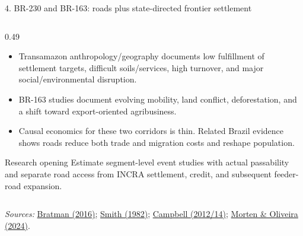 \documentclass[aspectratio=169,10pt]{beamer}
\newcommand{\ShortSource}[1]{%
  \vfill\par\tiny\color{Muted}\textit{Sources:} #1}
\begin{document}
\begin{frame}{4. BR-230 and BR-163: roads plus state-directed frontier settlement}
\begin{columns}[T,onlytextwidth]
\begin{column}{0.49\textwidth}
  \begin{itemize}\setlength\itemsep{0.28em}
    \item Transamazon anthropology/geography documents low fulfillment of settlement targets, difficult soils/services, high turnover, and major social/environmental disruption.
    \item BR-163 studies document evolving mobility, land conflict, deforestation, and a shift toward export-oriented agribusiness.
    \item Causal economics for these two corridors is thin. Related Brazil evidence shows roads reduce both trade and migration costs and reshape population.
  \end{itemize}
  \begin{block}{Research opening}
    Estimate segment-level event studies with actual passability and separate road access from INCRA settlement, credit, and subsequent feeder-road expansion.
  \end{block}
\end{column}
\end{columns}
\ShortSource{\href{https://doi.org/10.1590/1809-4422ASOC256V1922016}{Bratman (2016)}; \href{https://doi.org/10.1525/9780520314320}{Smith (1982)}; \href{https://docs.rwu.edu/fcas_fp/151/}{Campbell (2012/14)}; \href{https://doi.org/10.1257/app.20180487}{Morten \& Oliveira (2024)}.}
\end{frame}

\end{document}
